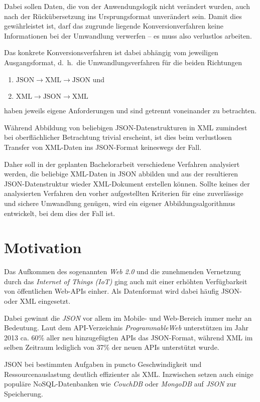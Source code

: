 \documentclass[conference]{template/IEEEtran}
\begin{document}
Dabei sollen Daten, die von der Anwendungslogik nicht verändert wurden, auch
nach der Rückübersetzung ins Ursprungsformat unverändert sein. Damit dies
gewährleistet ist, darf das zugrunde liegende Konversionverfahren keine
Informationen bei der Umwandlung verwerfen -- es muss also verlustlos %
arbeiten.

Das konkrete Konversionsverfahren ist dabei abhängig vom jeweiligen
Ausgangsformat, d.~h.\ die Umwandlungsverfahren für die beiden Richtungen
\begin{enumerate}
    \item $\text{JSON} \rightarrow \text{XML} \rightarrow \text{JSON}$ und
    \item $\text{XML} \rightarrow \text{JSON} \rightarrow \text{XML}$
\end{enumerate}
haben jeweils eigene Anforderungen und sind getrennt voneinander zu betrachten.

Während Abbildung von beliebigen JSON-Datenstrukturen in XML zumindest bei
oberflächlicher Betrachtung trivial erscheint, ist dies beim verlustlosen
Transfer von XML-Daten ins JSON-Format keineswegs der Fall.

Daher soll in der geplanten Bachelorarbeit verschiedene Verfahren analysiert
werden, die beliebige XML-Daten in JSON abbilden und aus der resultieren
JSON-Datenstruktur wieder XML-Dokument erstellen können. Sollte keines
der analysierten Verfahren den vorher aufgestellten Kriterien für eine
zuverlässige und sichere Umwandlung genügen, wird ein eigener
Abbildungsalgorithmus entwickelt, bei dem dies der Fall ist.

\section{Motivation}
\label{sec:motivation}
Das Aufkommen des sogenannten \emph{Web 2.0} und die zunehmenden Vernetzung
durch das \emph{Internet of Things (IoT)} ging auch mit einer erhöhten
Verfügbarkeit von öffentlichen Web-APIs einher. Als Datenformat wird dabei
häufig JSON- oder XML eingesetzt.

Dabei gewinnt die \emph{JSON} vor allem im Mobile-
und Web-Bereich immer mehr an Bedeutung. Laut dem API-Verzeichnis
\emph{ProgrammableWeb} unterstützen im Jahr 2013 ca. 60\% aller neu
hinzugefügten APIs das JSON-Format, während XML im selben Zeitraum lediglich
von 37\% der neuen APIs unterstützt wurde.\cite{duvander2013convergence}

JSON bei bestimmten Aufgaben in puncto Geschwindigkeit und Ressourcenauslastung
deutlich effizienter\cite{nurseitov2009comparison} als XML\@. Inzwischen setzen
auch einige populäre NoSQL-Datenbanken wie \emph{CouchDB} oder \emph{MongoDB}
auf \emph{JSON} zur Speicherung.
\end{document}
